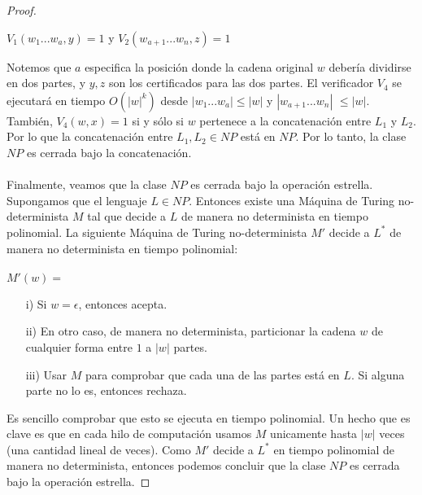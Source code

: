 \documentclass[letterpaper,10pt]{article}
\begin{document}
\begin{enumerate}
\begin{itemize}
\begin{proof}
              \begin{center}
                  $V_1(w_1 ... w_a, y) = 1$ y $V_2(w_{a+1} ... w_n, z) = 1$
              \end{center}
              
              Notemos que $a$ especifica la posición donde la cadena original 
              $w$ debería dividirse en dos partes, y $y, z$ son los certificados
              para las dos partes. El verificador $V_4$ se ejecutará en tiempo
              $O(|w|^{k})$ desde $|w_1 ... w_a| \leq |w|$ y $|w_{a+1} ... w_n|$
              $\leq |w|$. También, $V_4(w, x) = 1$ si y sólo si $w$ pertenece
              a la concatenación entre $L_1$ y $L_2$. Por lo que la
              concatenación entre $L_1, L_2 \in NP$ está en $NP$. Por lo tanto,
              la clase $NP$ es cerrada bajo la concatenación. \\ \\
              Finalmente, veamos que la clase $NP$ es cerrada bajo la operación
              estrella.  Supongamos que el lenguaje  $L \in NP$. Entonces 
              existe una Máquina de Turing no-determinista $M$ tal que decide
              a $L$ de manera no determinista en tiempo polinomial. La siguiente
              Máquina de Turing no-determinista $M'$ decide a $L^{*}$ de
              manera no determinista en tiempo polinomial: \\ \\
              $M'(w) = $
              
              \begin{itemize}
                  
                  \item[i)] Si $w = \epsilon$, entonces acepta. 
                  \item[ii)] En otro caso, de manera no determinista,
                  particionar la cadena $w$ de cualquier forma entre $1$ a 
                  $|w|$ partes. 
                  \item[iii)] Usar $M$ para comprobar que cada una de las partes
                  está en $L$. Si alguna parte no lo es, entonces rechaza. 
                  
              \end{itemize}
              
              Es sencillo comprobar que esto se ejecuta en tiempo polinomial. 
              Un hecho que es clave es que en cada hilo de computación usamos
              $M$ unicamente hasta $|w|$ veces (una cantidad lineal de veces).
              Como $M'$ decide a $L^{*}$ en tiempo polinomial de manera no
              determinista, entonces podemos concluir que la clase $NP$ es 
              cerrada bajo la operación estrella. 
              

\end{proof}
\end{itemize}
\end{enumerate}
\end{document}
